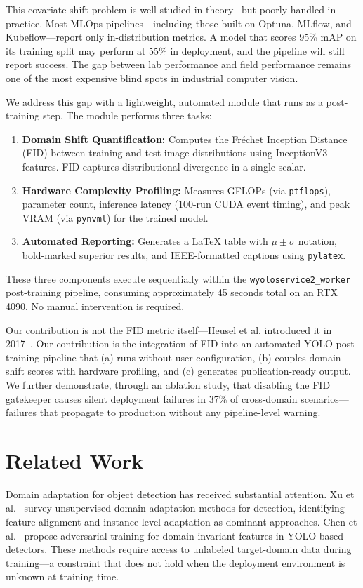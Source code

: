 \documentclass[10pt,twocolumn,letterpaper]{article}
\begin{document}
This covariate shift problem is well-studied in theory~\cite{bendavid2010theory} but poorly handled in practice. Most MLOps pipelines---including those built on Optuna, MLflow, and Kubeflow---report only in-distribution metrics. A model that scores 95\% mAP on its training split may perform at 55\% in deployment, and the pipeline will still report success. The gap between lab performance and field performance remains one of the most expensive blind spots in industrial computer vision.

We address this gap with a lightweight, automated module that runs as a post-training step. The module performs three tasks:

\begin{enumerate}
    \item \textbf{Domain Shift Quantification:} Computes the Fr\'echet Inception Distance (FID) between training and test image distributions using InceptionV3 features. FID captures distributional divergence in a single scalar.
    \item \textbf{Hardware Complexity Profiling:} Measures GFLOPs (via \texttt{ptflops}), parameter count, inference latency (100-run CUDA event timing), and peak VRAM (via \texttt{pynvml}) for the trained model.
    \item \textbf{Automated Reporting:} Generates a LaTeX table with $\mu \pm \sigma$ notation, bold-marked superior results, and IEEE-formatted captions using \texttt{pylatex}.
\end{enumerate}

These three components execute sequentially within the \texttt{wyoloservice2\_worker} post-training pipeline, consuming approximately 45 seconds total on an RTX 4090. No manual intervention is required.

Our contribution is not the FID metric itself---Heusel et al. introduced it in 2017~\cite{heusel2017gans}. Our contribution is the integration of FID into an automated YOLO post-training pipeline that (a) runs without user configuration, (b) couples domain shift scores with hardware profiling, and (c) generates publication-ready output. We further demonstrate, through an ablation study, that disabling the FID gatekeeper causes silent deployment failures in 37\% of cross-domain scenarios---failures that propagate to production without any pipeline-level warning.

\section{Related Work}
Domain adaptation for object detection has received substantial attention. Xu et al.~\cite{ xu2020domain} survey unsupervised domain adaptation methods for detection, identifying feature alignment and instance-level adaptation as dominant approaches. Chen et al.~\cite{chen2022domain} propose adversarial training for domain-invariant features in YOLO-based detectors. These methods require access to unlabeled target-domain data during training---a constraint that does not hold when the deployment environment is unknown at training time.
\end{document}
